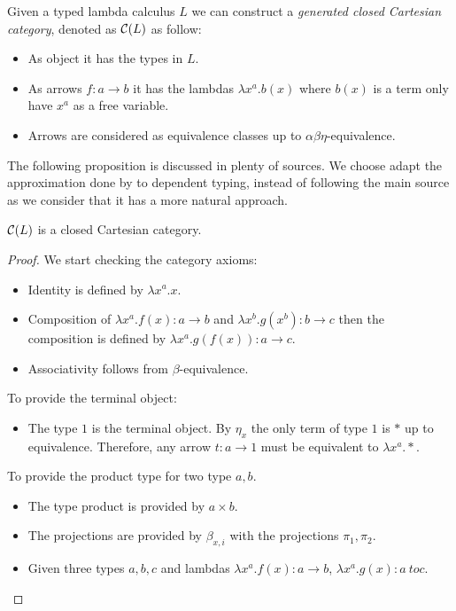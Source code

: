\begin{definition}
\begin{definition}
  Given a typed lambda calculus $L$ we can construct a \emph{generated closed Cartesian category}, denoted as $\mathcal{C} (L)$ as follow:
  \begin{itemize}
  \item As object it has the types in $L$.
  \item As arrows $f:a\to b$ it has the lambdas $\lambda x^a. b(x)$ where $b(x)$ is a term only have $x^a$ as a free variable.
  \item Arrows are considered as equivalence classes up to $\alpha\beta\eta$-equivalence.
  \end{itemize}
\end{definition}

The following proposition is discussed in plenty of sources. We choose adapt the approximation done by \cite{seely1984locally} to dependent typing, instead of following the main source \cite{lambek1985cartesian} as we consider that it has a more natural approach.
\begin{proposition}
  $\mathcal{C} (L)$ is a closed Cartesian  category. 
\end{proposition}
\begin{proof}
  We start checking the category axioms:
  \begin{itemize}
  \item Identity is defined by $\lambda x^a.x$.
  \item Composition of $\lambda x^a. f(x):  a\to b$ and $\lambda x^b. g(x^b): b \to c$ then the composition is defined by $\lambda x^a. g(f(x)): a \to c$.
  \item Associativity follows from $\beta$-equivalence.\\
  \end{itemize}
  To provide the terminal object:
  \begin{itemize}
  \item The type $1$ is the terminal object. By $\eta_x$ the only term of type $1$ is $*$ up to equivalence. Therefore, any arrow $t:a \to 1$ must be equivalent to $\lambda x^a. *$.\\
  \end{itemize}
  To provide the product type for two type $a,b$.
  \begin{itemize}
  \item The type product is provided by $a \times b$.
  \item The projections are provided by $\beta_{x,i}$ with the projections $\pi_1,\pi_2$.
  \item Given three types $a,b,c$ and lambdas $\lambda x^a. f(x) : a\to b$, $\lambda x^a. g(x) : a\ to c$.

\end{itemize}
\end{proof}
\end{definition}
